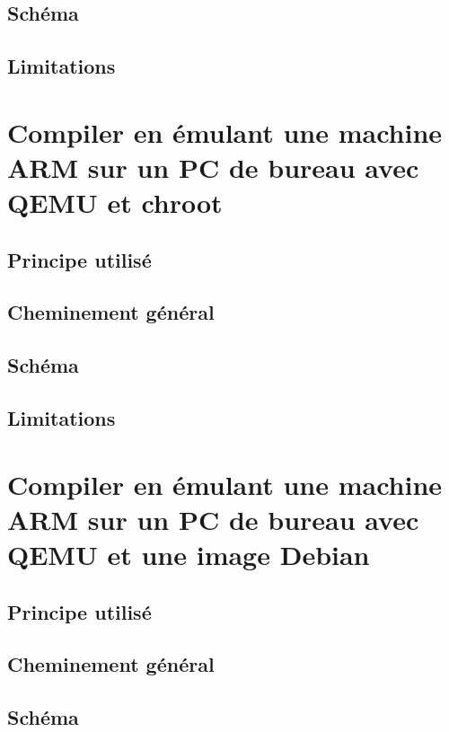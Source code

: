 \documentclass[11pt,a4paper,oneside]{article}
\begin{document}
\subsection{Schéma}

\subsection{Limitations}



\section{Compiler en émulant une machine ARM sur un PC de bureau avec QEMU et chroot}

\subsection{Principe utilisé}

\subsection{Cheminement général}

\subsection{Schéma}

\subsection{Limitations}



\section{Compiler en émulant une machine ARM sur un PC de bureau avec QEMU et une image Debian}

\subsection{Principe utilisé}

\subsection{Cheminement général}

\subsection{Schéma}
\end{document}
